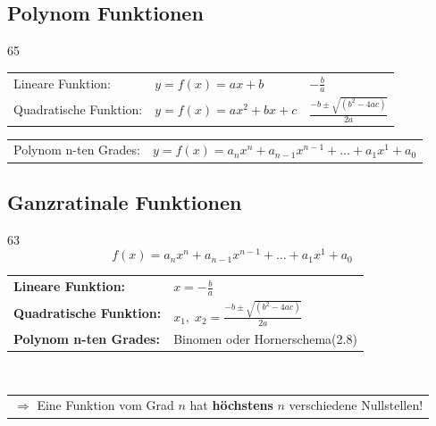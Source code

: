 \subsection{Polynom Funktionen}{65}

\renewcommand{\arraystretch}{1.6}
\begin{tabular}{lll}
    Lineare Funktion:       & $ y = f(x) = ax+b$            & $ -\frac{b}{a}$\\
    Quadratische Funktion:  & $ y = f(x) = ax^2+bx+c$       & $\frac{-b \pm \sqrt{(b^2-4ac)}}{2a}$ 
\end{tabular}
\begin{tabular}{ll}
    Polynom n-ten Grades:   & $ y = f(x) = a_nx^n + a_{n-1}x^{n-1} + \ldots + a_1x^1 + a_0$
\end{tabular}

\subsection{Ganzratinale Funktionen}{63}
\[
f(x) = a_nx^n + a_{n-1}x^{n-1} + \ldots + a_1x^1 + a_0
\]

\renewcommand{\arraystretch}{1.4}
\begin{tabular}{ll}
    \textbf{Lineare Funktion:}          &     $ x = -\frac{b}{a}$\\
    \textbf{Quadratische Funktion:}     &     $ x_1,\; x_2 = \frac{-b \pm \sqrt{(b^2-4ac)}}{2a}$\\
    \textbf{Polynom n-ten Grades:}      &     Binomen oder Hornerschema\;(2.8)
\end{tabular}\\
\begin{tabular}{l}
    $\Rightarrow$ Eine Funktion vom Grad $n$ hat \textbf{höchstens} $n$ verschiedene Nullstellen!
\end{tabular}

